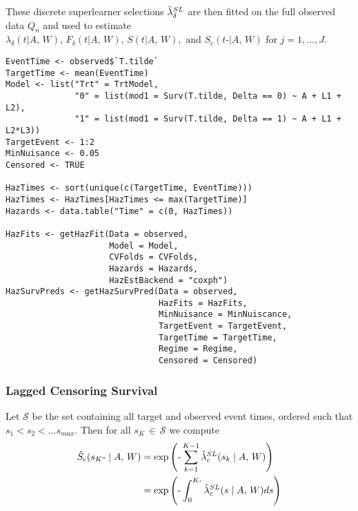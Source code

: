 \documentclass{report}
\newcommand{\1}{\ensuremath{\mathbf{1}}}
\newcommand{\AX}{\ensuremath{\mid A,\,{W}}}
\newcommand{\tK}{\ensuremath{K}}
\newcommand{\tKi}{\ensuremath{k}}
\begin{document}
These discrete superlearner selections \(\Hat{\lambda}_\delta^{SL}\) are then fitted on the full observed data \(Q_n\) and used to estimate \(\lambda_\delta(t \AX), \, F_\delta(t \AX),\, S(t \AX), \text{ and } S_c(t\text{-} \AX)\) for \(j = 1,\dots, J\).

\begin{lstlisting}
EventTime <- observed$`T.tilde`
TargetTime <- mean(EventTime)
Model <- list("Trt" = TrtModel,
              "0" = list(mod1 = Surv(T.tilde, Delta == 0) ~ A + L1 + L2),
              "1" = list(mod1 = Surv(T.tilde, Delta == 1) ~ A + L1 + L2*L3))
TargetEvent <- 1:2
MinNuisance <- 0.05
Censored <- TRUE

HazTimes <- sort(unique(c(TargetTime, EventTime)))
HazTimes <- HazTimes[HazTimes <= max(TargetTime)]
Hazards <- data.table("Time" = c(0, HazTimes))

HazFits <- getHazFit(Data = observed,
                     Model = Model,
                     CVFolds = CVFolds,
                     Hazards = Hazards,
                     HazEstBackend = "coxph")
HazSurvPreds <- getHazSurvPred(Data = observed,
                               HazFits = HazFits,
                               MinNuisance = MinNuiscance,
                               TargetEvent = TargetEvent,
                               TargetTime = TargetTime,
                               Regime = Regime,
                               Censored = Censored)
\end{lstlisting}

\subsubsection{Lagged Censoring Survival}
\label{sec:org66d4867}
Let \(\mathcal{S}\) be the set containing all target and observed event times, ordered such that \(s_1 < s_2 < \dots s_{max}\). Then for all \(s_{\tK} \,\in\, \mathcal{S}\) we compute
\begin{align*}
\Hat{S}_c(s_{\tK}\text{-} \AX) &= \exp \left(\text{-} \sum_{\tKi = 1}^{\tK-1} \Hat{\lambda}_c^{SL}(s_{\tKi} \AX)\right) \\
&= \exp\left(\text{-} \int_{0}^{\tK\text{-}} \Hat\lambda^{SL}_c(s \AX) ds\right)\\
\end{align*}
\end{document}
